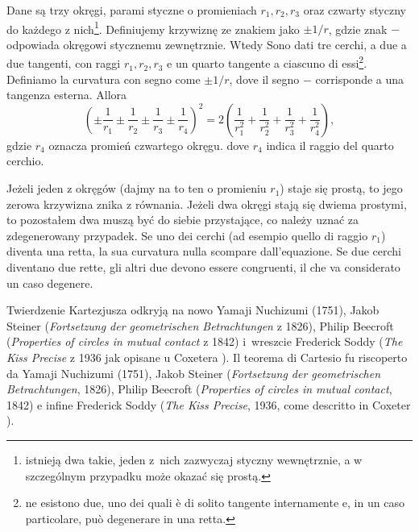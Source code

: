 \begin{theorem}
[Kartezjusza] %
[di Cartesio] %
Dane są trzy okręgi, parami styczne o promieniach $r_1, r_2, r_3$ oraz czwarty styczny do każdego z nich\footnote{istnieją dwa takie, jeden z~nich zazwyczaj styczny wewnętrznie, a w szczególnym przypadku może okazać się prostą.}. %
Definiujemy krzywiznę ze znakiem jako $\pm 1 / r$, gdzie znak $-$ odpowiada okręgowi stycznemu zewnętrznie. %
Wtedy%
Sono dati tre cerchi, a due a due tangenti, con raggi $r_1, r_2, r_3$ e un quarto tangente a ciascuno di essi\footnote{ne esistono due, uno dei quali è di solito tangente internamente e, in un caso particolare, può degenerare in una retta.}. %
Definiamo la curvatura con segno come $\pm 1 / r$, dove il segno $-$ corrisponde a una tangenza esterna. %
Allora%
\begin{equation}
    \left(\pm \frac{1}{r_1} \pm  \frac{1}{r_2} \pm  \frac{1}{r_3} \pm  \frac{1}{r_4}\right)^2 = 2 \left(\frac{1}{r_1^2} + \frac{1}{r_2^2} + \frac{1}{r_3^2} + \frac{1}{r_4^2}\right),
\end{equation}
gdzie $r_4$ oznacza promień czwartego okręgu.%
dove $r_4$ indica il raggio del quarto cerchio.%
\end{theorem}

Jeżeli jeden z okręgów (dajmy na to ten o promieniu $r_1$) staje się prostą, to jego zerowa krzywizna znika z równania. %
Jeżeli dwa okręgi stają się dwiema prostymi, to pozostałem dwa muszą być do siebie przystające, co należy uznać za zdegenerowany przypadek.%
Se uno dei cerchi (ad esempio quello di raggio $r_1$) diventa una retta, la sua curvatura nulla scompare dall'equazione. %
Se due cerchi diventano due rette, gli altri due devono essere congruenti, il che va considerato un caso degenere.%

Twierdzenie Kartezjusza odkryją na nowo Yamaji Nuchizumi (1751), Jakob Steiner (\emph{Fortsetzung der geometrischen Betrachtungen} z 1826), Philip Beecroft (\emph{Properties of circles in mutual contact} z 1842) i~wreszcie Frederick Soddy (\emph{The Kiss Precise} z 1936 jak opisane u Coxetera \cite[s. 29-31]{coxeter_1967}).%
Il teorema di Cartesio fu riscoperto da Yamaji Nuchizumi (1751), Jakob Steiner (\emph{Fortsetzung der geometrischen Betrachtungen}, 1826), Philip Beecroft (\emph{Properties of circles in mutual contact}, 1842) e infine Frederick Soddy (\emph{The Kiss Precise}, 1936, come descritto in Coxeter \cite[s. 29-31]{coxeter_1967}).%
%
%
%
%

